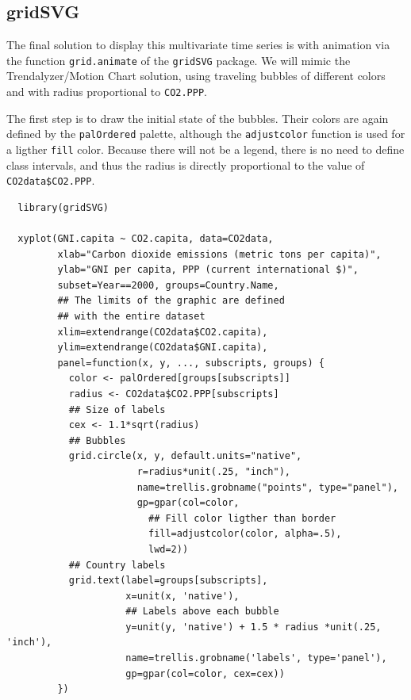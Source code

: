 \documentclass[smallroyalvopaper]{memoir}
\begin{document}
\subsection{\floweroneleft gridSVG}
\label{sec:org4cf5f5a}
The final solution to display this multivariate time series is with
animation via the function \texttt{grid.animate} of the \texttt{gridSVG}
package. We will mimic the Trendalyzer/Motion Chart solution, using
traveling bubbles of different colors and with radius proportional to
\texttt{CO2.PPP}.

The first step is to draw the initial state of the bubbles. Their
colors are again defined by the \texttt{palOrdered} palette, although the
\texttt{adjustcolor} function is used for a ligther \texttt{fill} color. Because
there will not be a legend, there is no need to define class
intervals, and thus the radius is directly proportional to the value
of \texttt{CO2data\$CO2.PPP}.


\lstset{language=r,label= ,caption= ,captionpos=b,numbers=none}
\begin{lstlisting}
  library(gridSVG)
  
  xyplot(GNI.capita ~ CO2.capita, data=CO2data,
         xlab="Carbon dioxide emissions (metric tons per capita)",
         ylab="GNI per capita, PPP (current international $)",
         subset=Year==2000, groups=Country.Name,
         ## The limits of the graphic are defined
         ## with the entire dataset
         xlim=extendrange(CO2data$CO2.capita),
         ylim=extendrange(CO2data$GNI.capita),
         panel=function(x, y, ..., subscripts, groups) {
           color <- palOrdered[groups[subscripts]]
           radius <- CO2data$CO2.PPP[subscripts]
           ## Size of labels
           cex <- 1.1*sqrt(radius)
           ## Bubbles
           grid.circle(x, y, default.units="native",
                       r=radius*unit(.25, "inch"),
                       name=trellis.grobname("points", type="panel"),
                       gp=gpar(col=color,
                         ## Fill color ligther than border
                         fill=adjustcolor(color, alpha=.5),
                         lwd=2))
           ## Country labels
           grid.text(label=groups[subscripts],
                     x=unit(x, 'native'),
                     ## Labels above each bubble
                     y=unit(y, 'native') + 1.5 * radius *unit(.25, 'inch'),
                     name=trellis.grobname('labels', type='panel'),
                     gp=gpar(col=color, cex=cex))
         })
\end{lstlisting}
\end{document}
